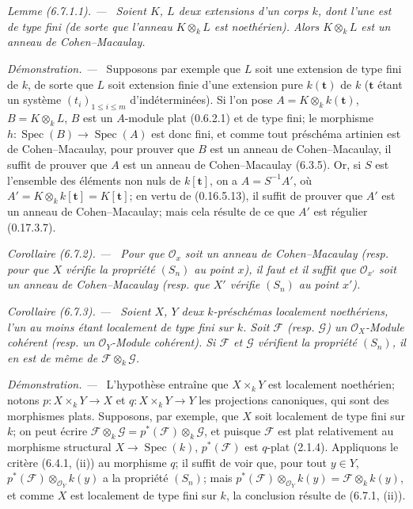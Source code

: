 \documentclass[10pt,oneside]{book}
\makeatletter
\newenvironment{corollary}[1][]{%
  \par\medskip\noindent\itshape Corollaire (#1). ---\ }{\par}
\newenvironment{lemma}[1][]{%
  \par\medskip\noindent\itshape Lemme (#1). ---\ }{\par}
\newenvironment{proof}{%
  \par\medskip\noindent\textit{Démonstration. ---\ }}{\par}
\newcommand{\EGAReaderTarget}[2]{\hypertarget{#1}{}\@bsphack\begingroup\def\@currentHref{#1}\label{#2}\endgroup\@esphack}
\makeatother
\begin{document}
\begin{lemma}[6.7.1.1]
\label{IV.2.s6.7.1.1-fr}
Soient $K$, $L$ deux extensions d'un corps $k$, dont l'une est de type
fini (de sorte que l'anneau $K\otimes_k L$ est noethérien). Alors
$K\otimes_k L$ est un anneau de Cohen--Macaulay.
\end{lemma}

\begin{proof}
Supposons par exemple que $L$ soit une extension de type fini de $k$,
de sorte que $L$ soit extension finie d'une extension pure $k(\boldsymbol t)$
de $k$ ($\boldsymbol t$ étant un système $(t_i)_{1\leqslant i\leqslant m}$
d'indéterminées). Si l'on pose $A=K\otimes_k k(\boldsymbol t)$,
$B=K\otimes_k L$, $B$ est un $A$-module plat (0.6.2.1) et de type fini;
le morphisme $h:\operatorname{Spec}(B)\to\operatorname{Spec}(A)$ est
donc fini, et comme tout préschéma artinien est de Cohen--Macaulay, pour
prouver que $B$ est un anneau de Cohen--Macaulay, il suffit de prouver que
$A$ est un anneau de Cohen--Macaulay (6.3.5). Or, si $S$ est l'ensemble
des éléments non nuls de $k[\boldsymbol t]$, on a $A=S^{-1}A'$, où
$A'=K\otimes_k k[\boldsymbol t]=K[\boldsymbol t]$; en vertu de
(0.16.5.13), il suffit de prouver que $A'$ est un anneau de
Cohen--Macaulay; mais cela résulte de ce que $A'$ est régulier (0.17.3.7).
\end{proof}

\begin{corollary}[6.7.2]
\EGAReaderTarget{ega4.c04.cor.6-7-2}{IV.2.s6.7.2-fr}
Pour que $\mathcal O_x$ soit un anneau de Cohen--Macaulay (resp. pour
que $X$ vérifie la propriété $(S_n)$ au point $x$), il faut et il suffit
que $\mathcal O_{x'}$ soit un anneau de Cohen--Macaulay (resp. que $X'$
vérifie $(S_n)$ au point $x'$).
\end{corollary}

\begin{corollary}[6.7.3]
\label{IV.2.s6.7.3-fr}
Soient $X$, $Y$ deux $k$-préschémas localement noethériens, l'un au
moins étant localement de type fini sur $k$. Soit $\mathscr F$ (resp.
$\mathscr G$) un $\mathcal O_X$-Module cohérent (resp. un
$\mathcal O_Y$-Module cohérent). Si $\mathscr F$ et $\mathscr G$
vérifient la propriété $(S_n)$, il en est de même de
$\mathscr F\otimes_k\mathscr G$.
\end{corollary}

\begin{proof}
L'hypothèse entraîne que $X\times_kY$ est localement noethérien; notons
$p:X\times_kY\to X$ et $q:X\times_kY\to Y$ les projections canoniques,
qui sont des morphismes plats. Supposons, par exemple, que $X$ soit
localement de type fini sur $k$; on peut écrire
$\mathscr F\otimes_k\mathscr G=p^*(\mathscr F)\otimes_k\mathscr G$,
et puisque $\mathscr F$ est plat relativement au morphisme structural
$X\to\operatorname{Spec}(k)$, $p^*(\mathscr F)$ est $q$-plat (2.1.4).
Appliquons le critère (6.4.1, (ii)) au morphisme $q$; il suffit de voir
que, pour tout $y\in Y$, $p^*(\mathscr F)\otimes_{\mathcal O_Y}k(y)$
a la propriété $(S_n)$; mais
$p^*(\mathscr F)\otimes_{\mathcal O_Y}k(y)=\mathscr F\otimes_k k(y)$,
et comme $X$ est localement de type fini sur $k$, la conclusion résulte
de (6.7.1, (ii)).
\end{proof}
\end{document}
